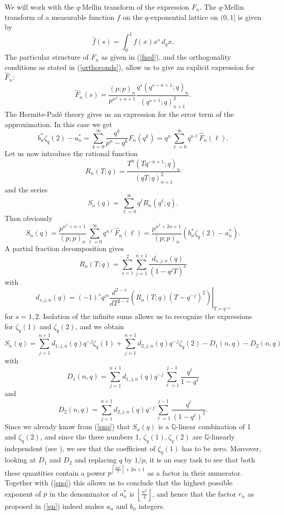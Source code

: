 \documentclass[12pt]{article}
\numberwithin{equation}{section}
\begin{document}
We will work with the $q$-Mellin transform of the expression
$F_n$.  The $q$-Mellin transform of a measurable function $f$
on the $q$-exponential lattice on $(0,1]$ is given by
\[\hat{f}(s)=\int_0^1f(x)x^s\,d_qx.\]
The particular structure of $F_n$ as given in (\ref{fnpl}), and
the orthogonality conditions as stated in (\ref{orthoconds}),
allow us to give an explicit expression for $\widehat{F}_n$:
\[\widehat{F}_n(s)=\frac{(p;p)_n}{p^{n^2+n+1}}\frac{q^s(q^{s-n+1};q)_n}{(q^{s+1};q)_{n+1}^2}.\]
The Hermite-Pad\'{e} theory gives us an expression for the error
term of the approximation.  In this case we get
\[b_n^*\zeta_q(2)-a_n^*=\sum_{k=0}^\infty\frac{q^k}{p^n-q^k}F_n(q^k)
=q^n\sum_{\ell=0}^\infty q^{n\ell}\widehat{F}_n(\ell).\]
Let us now introduce the rational function
\[R_n(T;q)=\frac{T^n(Tq^{-n+1};q)_n}{(qT;q)_{n+1}^2}\]
and the series
\[S_n(q)=\sum_{\ell=0}^\infty q^\ell R_n(q^\ell;q).\]
Then obviously
\begin{equation}\label{snq}
S_n(q)=\frac{p^{n^2+n+1}}{(p;p)_n}\sum_{\ell=0}^\infty
q^{n\ell}\widehat{F}_n(\ell)
=\frac{p^{n^2+2n+1}}{(p;p)_n}\left(b_n^*\zeta_q(2)-a_n^*\right).
\end{equation}
A partial fraction decomposition gives
\[R_n(T;q)=\sum_{s=1}^2\sum_{j=1}^{n+1}\frac{d_{s,j,n}(q)}{\left(1-q^jT\right)^s}\]
with
\[d_{s,j,n}(q)=(-1)^sq^{js}\left.\frac{d^{2-s}}{dT^{2-s}}\left(R_n(T;q)\left(T-q^{-j}\right)^2\right)\right|_{T=q^{-j}}\]
for $s=1,2$.  Isolation of the infinite sums allows us to
recognize the expressions for $\zeta_q(1)$ and $\zeta_q(2)$, and
we obtain
\[S_n(q)=\sum_{j=1}^{n+1}d_{1,j,n}(q)q^{-j}\zeta_q(1)
+\sum_{j=1}^{n+1}d_{2,j,n}(q)q^{-j}\zeta_q(2)-D_1(n,q)-D_2(n,q)\]
with
\[D_1(n,q)=\sum_{j=1}^{n+1}d_{1,j,n}(q)q^{-j}\sum_{\ell=1}^{j-1}\frac{q^\ell}{1-q^\ell} \]
and
\[  D_2(n,q)=\sum_{j=1}^{n+1}d_{2,j,n}(q)q^{-j}\sum_{\ell=1}^{j-1}\frac{q^\ell}{(1-q^\ell)^2}.\]
Since we already know from (\ref{snq}) that $S_n(q)$ is a $\mathbb{Q}$-linear
combination of 1 and $\zeta_q(2)$, and since the three numbers 1,
$\zeta_q(1), \zeta_q(2)$ are $\mathbb{Q}$-linearly independent
(see \cite{kelly}), we see that the coefficient of $\zeta_q(1)$
has to be zero.  Moreover, looking at $D_1$ and $D_2$ and replacing
$q$ by $1/p$, it is an easy task to see that both these quantities
contain a power $p^{\left\lceil\frac{3n^2}{4}\right\rceil+2n+1}$
as a factor in their numerator.  Together with (\ref{snq}) this
allows us to conclude that the highest possible exponent of $p$ in
the denominator of $a_n^*$ is
$\left\lfloor\frac{n^2}{4}\right\rfloor$, and hence that the
factor $e_n$ as proposed in (\ref{en}) indeed makes $a_n$ and
$b_n$ integers.
\medskip
\end{document}

